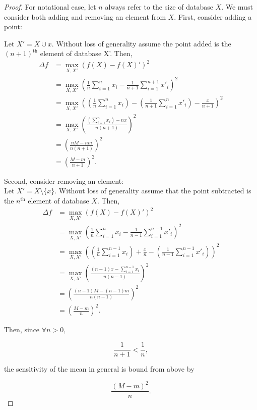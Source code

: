 \documentclass[11pt]{scrartcl} %
\begin{document}
\begin{proof}
	For notational ease, let $n$ always refer to the size of database $X$. We must consider both adding and removing an element from $X$. First, consider adding a point:

	Let $X' = X \cup x$. Without loss of generality assume the point added is the $(n+1)^\text{th}$ element of database X'. Then,
	\begin{align*}
		\Delta f &= \max_{X,X'} (f(X)- f(X)')^2 \\
					   &= \max_{X,X'} \left( \frac{1}{n}\sum_{i=1}^{n}x_i - \frac{1}{n+1}\sum_{i=1}^{n+1}x'_i \right)^2 \\
					   &= \max_{X,X'} \left( \left(\frac{1}{n}\sum_{i=1}^{n}x_i\right) - \left(\frac{1}{n+1}\sum_{i=1}^{n}x'_i\right) - \frac{x}{n+1} \right)^2 \\
					   &= \max_{X,X'} \left( \frac{ \left(\sum_{i=1}^{n}x_i\right) - nx }{n(n+1)} \right)^2 \\
					   &= \left( \frac{nM - nm}{n(n+1)} \right)^2 \\
					   &= \left( \frac{M - m}{n+1} \right)^2.
	\end{align*}

Second, consider removing an element:\\
Let $X' = X \setminus \{ x \}$. Without loss of generality assume that the point subtracted is the $n^\text{th}$ element of database $X$. Then,
	\begin{align*}
		\Delta f &= \max_{X,X'} (f(X)- f(X)')^2 \\
					   &= \max_{X,X'} \left( \frac{1}{n}\sum_{i=1}^{n}x_i - \frac{1}{n-1}\sum_{i=1}^{n-1}x'_i \right)^2 \\
					   &= \max_{X,X'} \left( \left( \frac{1}{n}\sum_{i=1}^{n-1}x_i \right) + \frac{x}{n} - \left( \frac{1}{n-1}\sum_{i=1}^{n-1}x'_i \right) \right)^2 \\
					   &= \max_{X,X'} \left( \frac{(n-1)x - \sum_{i=1}^{n-1}x_i }{n(n-1)} \right)^2 \\
					   &= \left( \frac{(n-1)M - (n-1)m}{n(n-1)} \right)^2 \\
					   &= \left( \frac{M-m}{n} \right)^2.
	\end{align*}
	
Then, since $\forall n > 0,$

$$ \frac{1}{n+1} < \frac{1}{n},$$

the sensitivity of the mean in general is bound from above by 

$$ \frac{(M-m)^2}{n}.$$
\end{proof}

% 
% 
\end{document}
